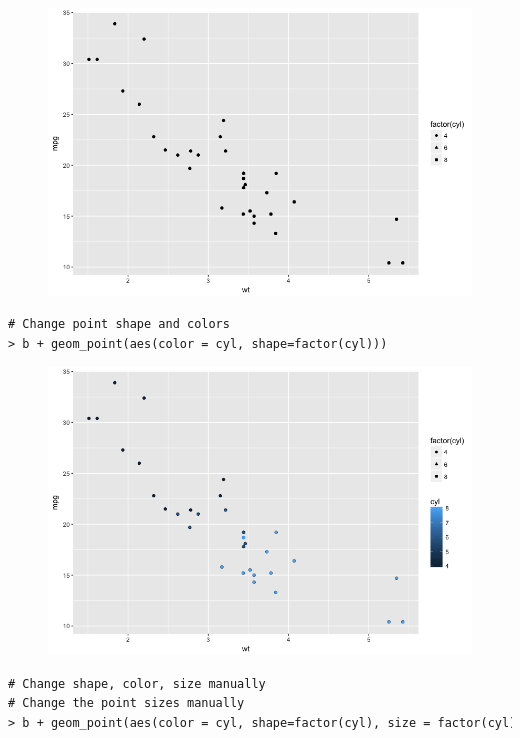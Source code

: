 \begin{figure}[H]\begin{center}\includegraphics[scale=1 ]{ilu/bg39.png}\end{center}\end{figure}
\begin{lstlisting}[language=html]
# Change point shape and colors
> b + geom_point(aes(color = cyl, shape=factor(cyl)))
\end{lstlisting}
\begin{figure}[H]\begin{center}\includegraphics[scale=1 ]{ilu/bg40.png}\end{center}\end{figure}
\begin{lstlisting}[language=html]
# Change shape, color, size manually
# Change the point sizes manually
> b + geom_point(aes(color = cyl, shape=factor(cyl), size = factor(cyl))) + scale_size_manual(values = c(2,3,4))
\end{lstlisting}
